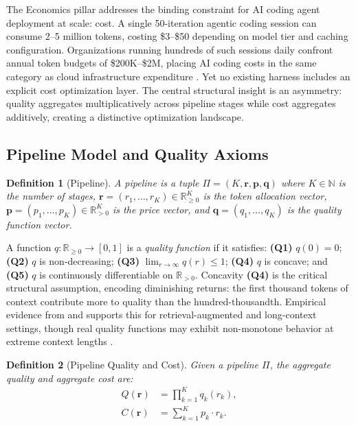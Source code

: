 \documentclass[11pt, a4paper]{googledeepmind}
\newtheorem{definition}{Definition}[section]
\begin{document}
The Economics pillar addresses the binding constraint for AI coding agent deployment at scale: cost. A single 50-iteration agentic coding session can consume 2--5 million tokens, costing \$3--\$50 depending on model tier and caching configuration. Organizations running hundreds of such sessions daily confront annual token budgets of \$200K--\$2M, placing AI coding costs in the same category as cloud infrastructure expenditure \citep{finops2023}. Yet no existing harness includes an explicit cost optimization layer. The central structural insight is an asymmetry: quality aggregates multiplicatively across pipeline stages while cost aggregates additively, creating a distinctive optimization landscape.

\subsection{Pipeline Model and Quality Axioms}

\begin{definition}[Pipeline]
\label{def:econ-pipeline}
A \emph{pipeline} is a tuple $\Pi = (K, \mathbf{r}, \mathbf{p}, \mathbf{q})$ where $K \in \mathbb{N}$ is the number of stages, $\mathbf{r} = (r_1, \ldots, r_K) \in \mathbb{R}_{\geq 0}^K$ is the token allocation vector, $\mathbf{p} = (p_1, \ldots, p_K) \in \mathbb{R}_{> 0}^K$ is the price vector, and $\mathbf{q} = (q_1, \ldots, q_K)$ is the quality function vector.
\end{definition}

A function $q: \mathbb{R}_{\geq 0} \to [0,1]$ is a \emph{quality function} if it satisfies: \textbf{(Q1)} $q(0) = 0$; \textbf{(Q2)} $q$ is non-decreasing; \textbf{(Q3)} $\lim_{r \to \infty} q(r) \leq 1$; \textbf{(Q4)} $q$ is concave; and \textbf{(Q5)} $q$ is continuously differentiable on $\mathbb{R}_{>0}$. Concavity \textbf{(Q4)} is the critical structural assumption, encoding diminishing returns: the first thousand tokens of context contribute more to quality than the hundred-thousandth. Empirical evidence from \citep{gao2025context} and \citep{liu2024lost} supports this for retrieval-augmented and long-context settings, though real quality functions may exhibit non-monotone behavior at extreme context lengths \citep{chroma2025rot}.

\begin{definition}[Pipeline Quality and Cost]
\label{def:econ-quality-cost}
Given a pipeline $\Pi$, the \emph{aggregate quality} and \emph{aggregate cost} are:
\begin{align}
    Q(\mathbf{r}) &= \prod_{k=1}^{K} q_k(r_k), \label{eq:econ-mult-quality} \\
    C(\mathbf{r}) &= \sum_{k=1}^{K} p_k \cdot r_k. \label{eq:econ-add-cost}
\end{align}
\end{definition}
\end{document}
